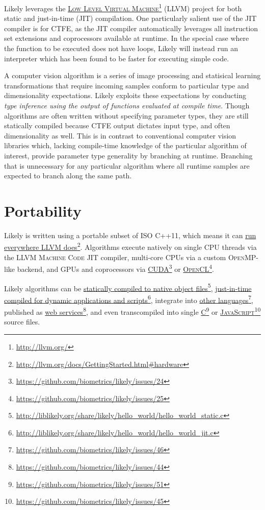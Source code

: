 \documentclass[numbers=noenddot]{scrbook}
\newcommand{\noun}[1]{\textsc{#1}}
\newcommand{\fref}[2]{\href{#1}{#2}\footnote{\href{#1}{#1}}}
\begin{document}
Likely leverages the \fref{http://llvm.org/}{\noun{Low Level Virtual Machine}} (LLVM) project for both static and just-in-time (JIT) compilation.
One particularly salient use of the JIT compiler is for CTFE, as the JIT compiler automatically leverages all instruction set extensions and coprocessors available at runtime.
In the special case where the function to be executed does not have loops, Likely will instead run an interpreter which has been found to be faster for executing simple code.

A computer vision algorithm is a series of image processing and statisical learning transformations that require incoming samples conform to particular type and dimensionality expectations.
Likely exploits these expectations by conducting \emph{type inference using the output of functions evaluated at compile time}.
Though algorithms are often written without specifying parameter types, they are still statically compiled because CTFE output dictates input type, and often dimensionality as well.
This is in contrast to conventional computer vision libraries which, lacking compile-time knowledge of the particular algorithm of interest, provide parameter type generality by branching at runtime.
Branching that is unnecessary for any particular algorithm where all runtime samples are expected to branch along the same path.

\section{Portability}
Likely is written using a portable subset of \noun{ISO C++11}, which means it can \fref{http://llvm.org/docs/GettingStarted.html\#hardware}{run everywhere LLVM does}.
Algorithms execute natively on single CPU threads via the LLVM \noun{Machine Code JIT} compiler, multi-core CPUs via a custom \noun{OpenMP}-like backend, and GPUs and coprocessors via \fref{https://github.com/biometrics/likely/issues/24}{\noun{CUDA}} or \fref{https://github.com/biometrics/likely/issues/25}{\noun{OpenCL}}.

Likely algorithms can be \fref{http://liblikely.org/share/likely/hello\_world/hello\_world\_static.c}{statically compiled to native object files}, \fref{http://liblikely.org/share/likely/hello\_world/hello\_world\_jit.c}{just-in-time compiled for dynamic applications and scripts}, integrate into \fref{https://github.com/biometrics/likely/issues/46}{other languages}, published as \fref{https://github.com/biometrics/likely/issues/44}{web services}, and even transcompiled into single \fref{https://github.com/biometrics/likely/issues/51}{\noun{C}} or \fref{https://github.com/biometrics/likely/issues/45}{\noun{JavaScript}} source files.
\end{document}
